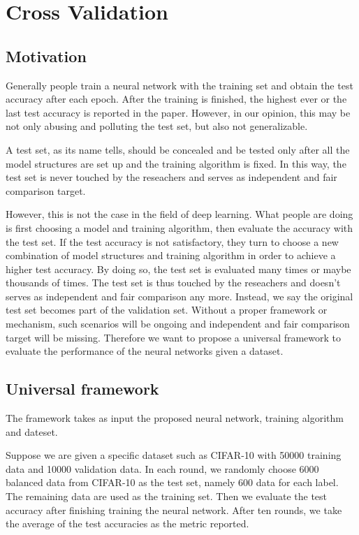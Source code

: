 \chapter{Cross Validation}
\section{Motivation}

Generally people train a neural network with the training set and obtain the test  accuracy after each epoch. After the training is finished, the highest ever or the last test  accuracy is reported in the paper. However, in our opinion, this may be not only abusing and polluting the test set, but also not generalizable. 

A test set, as its name tells, should be concealed and be tested only after all the model structures are set up and the training algorithm is fixed. In this way, the test set is never touched by the reseachers and serves as independent and fair comparison target. 

However, this is not the case in the field of deep learning. What people are doing is  first choosing a model and training algorithm, then evaluate the accuracy with the test set. If the test accuracy is not satisfactory, they turn to  choose a new combination of model structures and training algorithm in order to achieve a higher test accuracy. By doing so, the test set is evaluated many times or maybe thousands of times.  The test set is thus touched by the reseachers  and doesn't serves as independent and fair comparison any more. Instead, we say the original test set becomes part of the validation set. Without a proper framework or mechanism, such scenarios will be ongoing and  independent and fair comparison target will be missing. Therefore we want to propose a universal framework to evaluate the performance of the neural networks given a dataset. 

\section{Universal framework}
The framework takes as input the proposed neural network, training algorithm and dateset.

Suppose we are given a specific dataset such as CIFAR-10 with 50000 training data and 10000 validation data. 
In each round, we randomly choose 6000 balanced data from CIFAR-10 as the test set, namely 600 data for each label. The remaining data are used as the training set. Then we evaluate the test accuracy after finishing training the neural network. 
After ten rounds, we take the average of the test accuracies as the metric reported. 

